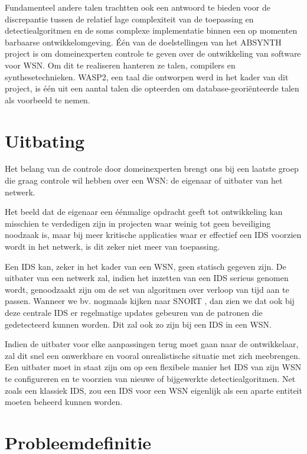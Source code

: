 Fundamenteel andere talen trachtten ook een antwoord te bieden voor de
discrepantie tussen de relatief lage complexiteit van de toepassing en
detectiealgoritmen en de soms complexe implementatie binnen een op momenten
barbaarse ontwikkelomgeving. \'E\'en van de doelstellingen van het ABSYNTH
project \citep{url:absynth} is om domeinexperten controle te geven over de
ontwikkeling van software voor WSN. Om dit te realiseren hanteren ze talen,
compilers en synthesetechnieken. WASP2, een taal die ontworpen werd in het
kader van dit project, is \'e\'en uit een aantal talen die opteerden om
database-geori\"enteerde talen als voorbeeld te nemen.

\section{Uitbating}
\label{section:problem-operations}

Het belang van de controle door domeinexperten brengt ons bij een laatste groep
die graag controle wil hebben over een WSN: de eigenaar of uitbater van het
netwerk.

Het beeld dat de eigenaar een \'e\'enmalige opdracht geeft tot ontwikkeling kan
misschien te verdedigen zijn in projecten waar weinig tot geen beveiliging
noodzaak is, maar bij meer kritische applicaties waar er effectief een IDS
voorzien wordt in het netwerk, is dit zeker niet meer van toepassing.

Een IDS kan, zeker in het kader van een WSN, geen statisch gegeven zijn. De
uitbater van een netwerk zal, indien het inzetten van een IDS serieus genomen
wordt, genoodzaakt zijn om de set van algoritmen over verloop van tijd aan te
passen. Wanneer we bv. nogmaals kijken naar SNORT \citep{roesch1999snort}, dan
zien we dat ook bij deze centrale IDS er regelmatige updates gebeuren van de
patronen die gedetecteerd kunnen worden. Dit zal ook zo zijn bij een IDS in een
WSN.

Indien de uitbater voor elke aanpassingen terug moet gaan naar de ontwikkelaar,
zal dit snel een onwerkbare en vooral onrealistische situatie met zich
meebrengen. Een uitbater moet in staat zijn om op een flexibele manier het IDS
van zijn WSN te configureren en te voorzien van nieuwe of bijgewerkte
detectiealgoritmen. Net zoals een klassiek IDS, zou een IDS voor een WSN
eigenlijk als een aparte entiteit moeten beheerd kunnen worden.

\section{Probleemdefinitie}
\label{section:problem-definition}

